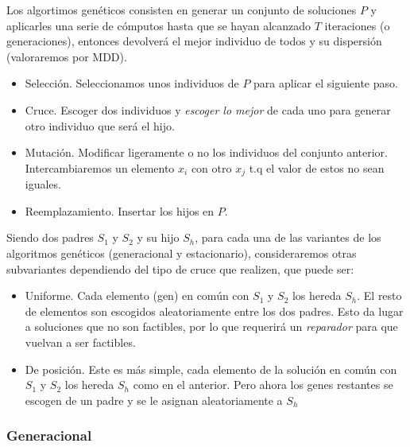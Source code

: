 \documentclass{article}
\begin{document}
    Los algortimos genéticos consisten en generar un conjunto de soluciones $P$ y
    aplicarles una serie de cómputos hasta que se hayan alcanzado $T$ iteraciones
    (o generaciones), entonces devolverá el mejor individuo de todos 
    y su dispersión (valoraremos por MDD).

    \begin{itemize}
        \item Selección.
        Seleccionamos unos individuos de $P$ para aplicar el siguiente paso.
        \item Cruce.
        Escoger dos individuos y \emph{escoger lo mejor} de cada uno para
        generar otro individuo que será el hijo.
        \item Mutación.
        Modificar ligeramente o no los individuos del conjunto anterior.
        Intercambiaremos un elemento $x_i$ con otro $x_j$ t.q el valor de estos
        no sean iguales.
        \item Reemplazamiento.
        Insertar los hijos en $P$.
    \end{itemize}

    Siendo dos padres $S_1$ y $S_2$ y su hijo $S_h$,
    para cada una de las variantes de los algoritmos genéticos (generacional y
    estacionario), consideraremos otras subvariantes dependiendo del tipo de cruce
    que realizen, que puede ser:

    \begin{itemize}
        \item Uniforme.
        Cada elemento (gen) en común con $S_1$ y $S_2$ los hereda $S_h$. El resto de
        elementos son escogidos aleatoriamente entre los dos padres. Esto da lugar a
        soluciones que no son factibles, por lo que requerirá un \emph{reparador} para
        que vuelvan a ser factibles.
        \item De posición.
        Este es más simple, cada elemento de la solución en común con $S_1$ y $S_2$
        los hereda $S_h$ como en el anterior. Pero ahora los genes restantes se escogen
        de un padre y se le asignan aleatoriamente a $S_h$
    \end{itemize}

    \subsubsection{Generacional}
\end{document}
